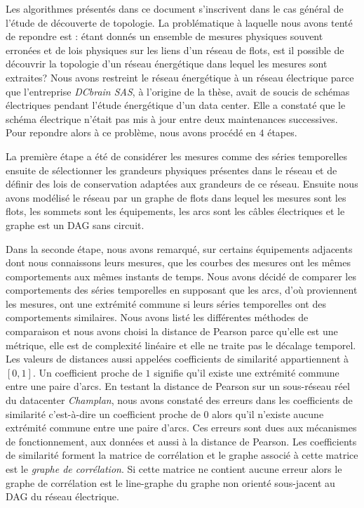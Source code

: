Les algorithmes pr\'esent\'es dans ce document s'inscrivent dans le cas g\'en\'eral de l'\'etude de d\'ecouverte de topologie. La probl\'ematique \`a laquelle nous avons tent\'e de repondre est :
\'etant donn\'es un ensemble de mesures physiques souvent erron\'ees et de lois physiques sur les liens d'un r\'eseau de flots, est il possible de d\'ecouvrir la topologie d'un r\'eseau \'energ\'etique dans lequel les mesures sont extraites?
Nous avons restreint le r\'eseau \'energ\'etique \`a un r\'eseau \'electrique parce que l'entreprise {\em DCbrain SAS}, \`a l'origine de la th\`ese, avait de soucis de sch\'emas \'electriques pendant l'\'etude \'energ\'etique d'un data center. Elle a constat\'e que le sch\'ema \'electrique n'\'etait pas mis \`a jour  entre deux maintenances successives.
Pour repondre alors \`a ce probl\`eme, nous avons proc\'ed\'e en $4$ \'etapes.
\newline

La premi\`ere \'etape a \'et\'e de consid\'erer les mesures comme des s\'eries temporelles ensuite de s\'electionner les grandeurs physiques pr\'esentes dans le r\'eseau et de d\'efinir des lois de conservation adapt\'ees aux grandeurs de ce r\'eseau. Ensuite nous avons mod\'elis\'e le r\'eseau par un graphe de flots dans lequel les mesures sont les flots, les sommets sont les \'equipements, les arcs sont les c\^ables \'electriques et le graphe est un DAG sans circuit.
\newline

Dans la seconde \'etape, nous avons remarqu\'e, sur certains \'equipements adjacents dont nous connaissons leurs mesures, que les courbes des mesures ont les m\^emes comportements aux m\^emes instants de temps. Nous avons d\'ecid\'e de comparer  les comportements des s\'eries temporelles en supposant que les arcs, d'o\`u proviennent les mesures, ont une extr\'emit\'e commune si leurs s\'eries temporelles ont des comportements similaires. Nous avons list\'e les diff\'erentes m\'ethodes de comparaison et nous avons choisi la distance de Pearson parce qu'elle est une m\'etrique, 
elle est de complexit\'e lin\'eaire et 
elle ne traite pas le d\'ecalage temporel. 
Les valeurs de distances aussi appel\'ees coefficients de similarit\'e appartiennent \`a $[0,1]$. Un coefficient proche de $1$ signifie qu'il existe une extr\'emit\'e commune entre une paire d'arcs. En testant la distance de Pearson sur un sous-r\'eseau r\'eel du datacenter {\em Champlan}, nous avons constat\'e des erreurs dans les coefficients de similarit\'e c'est-\`a-dire un coefficient proche de $0$ alors qu'il n'existe aucune extr\'emit\'e commune entre une paire d'arcs. Ces erreurs  sont dues aux m\'ecanismes de fonctionnement, aux donn\'ees et aussi \`a la distance de Pearson. 
Les coefficients de similarit\'e forment la matrice de corr\'elation et le graphe associ\'e \`a cette matrice est le {\em graphe de corr\'elation}. Si cette matrice ne contient aucune erreur alors le graphe de corr\'elation est le line-graphe du graphe non orient\'e sous-jacent au DAG du r\'eseau \'electrique. 
\newline

